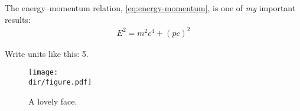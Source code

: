 The energy--momentum relation, \cref{eq:energy-momentum}, is one of \emph{my}
important results:
\begin{align}
    E^2 = m^2 c^4 + (p c)^2 \label{eq:energy-momentum}
\end{align}

Write units like this: \u{5}{\micro\meter}.

\begin{figure}
  \caption{A lovely face.}
\label{fig:some-figure}
\texttt{[image: \\dir/figure.pdf]}
\end{figure}
